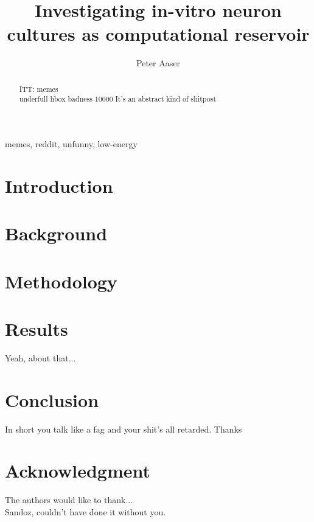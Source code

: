 \documentclass[journal]{IEEEtran}
\begin{document}
\title{Investigating in-vitro neuron cultures as computational reservoir}

\author{Peter Aaser}
%
\maketitle

\begin{abstract}
  ITT: memes\\
  underfull hbox badness $10000$
  It's an abstract kind of shitpost
\end{abstract}

\begin{IEEEkeywords}
memes, reddit, unfunny, low-energy
\end{IEEEkeywords}

\section{Introduction}

\section{Background}

\section{Methodology}

\newpage
%
\section{Results}
Yeah, about that...

\section{Conclusion}
In short you talk like a fag and your shit's all retarded. Thanks

\section*{Acknowledgment}
The authors would like to thank...\\
Sandoz, couldn't have done it without you.


 

\end{document}
